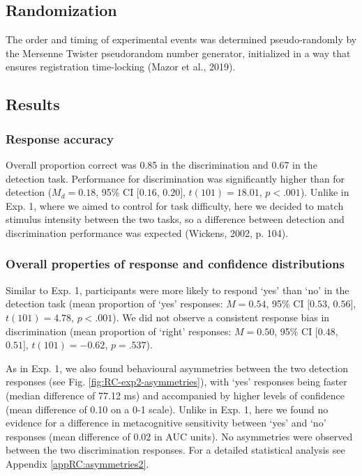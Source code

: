\documentclass[12pt,twoside]{reedthesis}
\begin{document}
\hypertarget{randomization-2}{%
\subsection{Randomization}\label{randomization-2}}

The order and timing of experimental events was determined pseudo-randomly by the Mersenne Twister pseudorandom number generator, initialized in a way that ensures registration time-locking (Mazor et al., 2019).

\hypertarget{results-5}{%
\subsection{Results}\label{results-5}}

\hypertarget{response-accuracy-1}{%
\subsubsection{Response accuracy}\label{response-accuracy-1}}

Overall proportion correct was 0.85 in the discrimination and 0.67 in the detection task. Performance for discrimination was significantly higher than for detection (\(M_d = 0.18\), 95\% CI \([0.16\), \(0.20]\), \(t(101) = 18.01\), \(p < .001\)). Unlike in Exp. 1, where we aimed to control for task difficulty, here we decided to match stimulus intensity between the two tasks, so a difference between detection and discrimination performance was expected (Wickens, 2002, p. 104).

\hypertarget{overall-properties-of-response-and-confidence-distributions}{%
\subsubsection{Overall properties of response and confidence distributions}\label{overall-properties-of-response-and-confidence-distributions}}

Similar to Exp. 1, participants were more likely to respond `yes' than `no' in the detection task (mean proportion of `yes' responses: \(M = 0.54\), 95\% CI \([0.53\), \(0.56]\), \(t(101) = 4.78\), \(p < .001\)). We did not observe a consistent response bias in discrimination (mean proportion of `right' responses: \(M = 0.50\), 95\% CI \([0.48\), \(0.51]\), \(t(101) = -0.62\), \(p = .537\)).

As in Exp. 1, we also found behavioural asymmetries between the two detection responses (see Fig. \ref{fig:RC-exp2-asymmetries}), with `yes' responses being faster (median difference of 77.12 ms) and accompanied by higher levels of confidence (mean difference of 0.10 on a 0-1 scale). Unlike in Exp. 1, here we found no evidence for a difference in metacognitive sensitivity between `yes' and `no' responses (mean difference of 0.02 in AUC units). No asymmetries were observed between the two discrimination responses. For a detailed statistical analysis see Appendix \ref{appRC:asymmetries2}.
\end{document}
